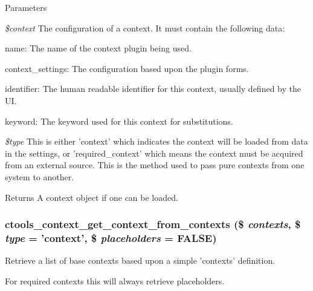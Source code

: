 \begin{DoxyParams}{Parameters}
\item[{\em \$context}]The configuration of a context. It must contain the following data:
\begin{DoxyItemize}
\item name: The name of the context plugin being used.
\item context\_\-settings: The configuration based upon the plugin forms.
\item identifier: The human readable identifier for this context, usually defined by the UI.
\item keyword: The keyword used for this context for substitutions. 
\end{DoxyItemize}\item[{\em \$type}]This is either 'context' which indicates the context will be loaded from data in the settings, or 'required\_\-context' which means the context must be acquired from an external source. This is the method used to pass pure contexts from one system to another.\end{DoxyParams}
\begin{DoxyReturn}{Returns}
A context object if one can be loaded. 
\end{DoxyReturn}
\hypertarget{context_8inc_ad0282216d1c9d6bb8d941c6f32a1e2ef}{
\subsubsection[{ctools\_\-context\_\-get\_\-context\_\-from\_\-contexts}]{\setlength{\rightskip}{0pt plus 5cm}ctools\_\-context\_\-get\_\-context\_\-from\_\-contexts (\$ {\em contexts}, \/  \$ {\em type} = {\ttfamily 'context'}, \/  \$ {\em placeholders} = {\ttfamily FALSE})}}
\label{context_8inc_ad0282216d1c9d6bb8d941c6f32a1e2ef}
Retrieve a list of base contexts based upon a simple 'contexts' definition.

For required contexts this will always retrieve placeholders.



